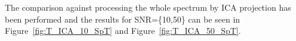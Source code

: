 %
% 


The comparison against processing the whole spectrum by ICA projection 
has been performed and the results for SNR=\{10,50\} can be seen 
in Figure~\ref{fig:T_ICA_10_SpT} and Figure~\ref{fig:T_ICA_50_SpT}.

